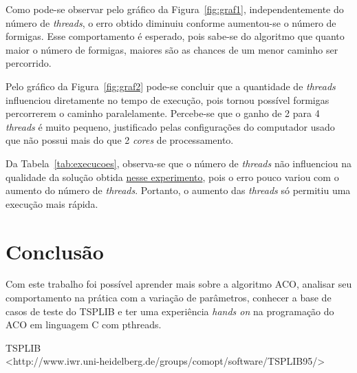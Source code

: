 \documentclass[a4paper, twoside, 12pt]{article}
\begin{document}
Como pode-se observar pelo gráfico da Figura~\ref{fig:graf1}, independentemente do número de \textit{threads}, o erro obtido diminuiu conforme aumentou-se o número de formigas. Esse comportamento é esperado, pois sabe-se do algoritmo que quanto maior o número de formigas, maiores são as chances de um menor caminho ser percorrido.

Pelo gráfico da Figura~\ref{fig:graf2} pode-se concluir que a quantidade de \textit{threads} influenciou diretamente no tempo de execução, pois tornou possível formigas percorrerem o caminho paralelamente. Percebe-se que o ganho de 2 para 4 \textit{threads} é muito pequeno, justificado pelas configurações do computador usado que não possui mais do que 2 \textit{cores} de processamento.

Da Tabela~\ref{tab:execucoes}, observa-se que o número de \textit{threads} não influenciou na qualidade da solução obtida \underline{nesse experimento}, pois o erro pouco variou com o aumento do número de \textit{threads}. Portanto, o aumento das \textit{threads} só permitiu uma execução mais rápida.

\clearpage
\section{Conclusão \label{sec:conclusao}}

Com este trabalho foi possível aprender mais sobre a algoritmo ACO, analisar seu comportamento na prática com a variação de parâmetros, conhecer a base de casos de teste do TSPLIB e ter uma experiência \textit{hands on} na programação do ACO em linguagem C com pthreads.



\begin{thebibliography}{9}

		TSPLIB\\
		\textless http://www.iwr.uni-heidelberg.de/groups/comopt/software/TSPLIB95/\textgreater

\end{thebibliography}

\end{document}
